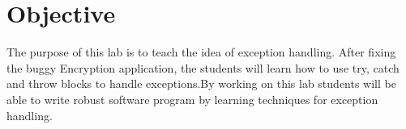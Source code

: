 \section{Objective}

The purpose of this lab is to teach the idea of exception handling. After fixing the buggy Encryption application, the students will learn how to use try, catch and throw blocks to handle exceptions.By working on this lab students will be able to write robust software program by learning techniques for  exception handling.
